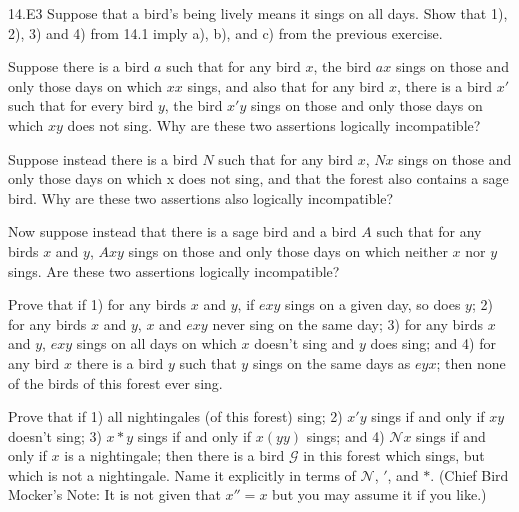 \documentclass[12pt, letterpaper]{article}
\begin{document}
\begin{prob}{14.E3}
Suppose that a bird's being lively means it sings on all days. Show that 1), 2), 3) and 4) from 14.1 imply a), b), and c) from the previous exercise.
\end{prob}

\begin{prob}{15.1} 
Suppose there is a bird $a$ such that for any bird $x$, the bird $ax$ sings on those and only those days on which $xx$ sings, and also that for any bird $x$, there is a bird $x'$ such that for every bird $y$, the bird $x'y$ sings on those and only those days on which $xy$ does not sing. Why are these two assertions logically incompatible?
\end{prob}

\begin{prob}{15.2} 
Suppose instead there is a bird $N$ such that for any bird $x$, $Nx$ sings on those and only those days on which x does not sing, and that the forest also contains a sage bird. Why are these two assertions also logically incompatible?
\end{prob}

\begin{prob}{15.3} 
Now suppose instead that there is a sage bird and a bird $A$ such that for any birds $x$ and $y$, $Axy$ sings on those and only those days on which neither $x$ nor $y$ sings. Are these two assertions logically incompatible?
\end{prob}

\begin{prob}{16.1} 
Prove that if 1) for any birds $x$ and $y$, if $exy$ sings on a given day, so does $y$; 2) for any birds $x$ and $y$, $x$ and $exy$ never sing on the same day; 3) for any birds $x$ and $y$, $exy$ sings on all days on which $x$ doesn't sing and $y$ does sing; and 4) for any bird $x$ there is a bird $y$ such that $y$ sings on the same days as $eyx$; then none of the birds of this forest ever sing.
\end{prob}

\begin{prob}{17.1} 
Prove that if 1) all nightingales (of this forest) sing; 2) $x'y$ sings if and only if $xy$ doesn't sing; 3) $x*y$ sings if and only if $x(yy)$ sings; and 4) $\mathcal{N}x$ sings if and only if $x$ is a nightingale; then there is a bird $\mathcal{G}$ in this forest which sings, but which is not a nightingale. Name it explicitly in terms of $\mathcal{N}$, $'$, and $*$. (Chief Bird Mocker's Note: It is not given that $x'' = x$ but you may assume it if you like.)
\end{prob}
\end{document}
